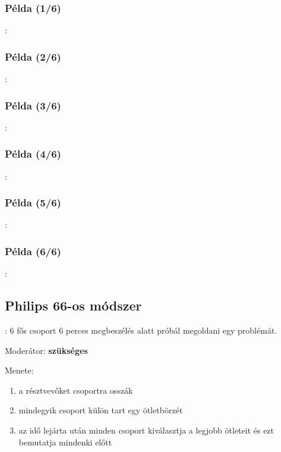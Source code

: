 \documentclass{beamer}
\begin{document}
\subsubsection*{Példa (1/6)}
\begin{frame}{\subsecname : \subsubsecname}
    
\end{frame}

\subsubsection*{Példa (2/6)}
\begin{frame}{\subsecname : \subsubsecname}
    
\end{frame}

\subsubsection*{Példa (3/6)}
\begin{frame}{\subsecname : \subsubsecname}
    
\end{frame}

\subsubsection*{Példa (4/6)}
\begin{frame}{\subsecname : \subsubsecname}
    
\end{frame}

\subsubsection*{Példa (5/6)}
\begin{frame}{\subsecname : \subsubsecname}
    
\end{frame}

\subsubsection*{Példa (6/6)}
\begin{frame}{\subsecname : \subsubsecname}
    
\end{frame}

\subsection{Philips 66-os módszer}
\begin{frame}{\secname : \subsecname}
6 fős csoport 6 perces megbeszélés alatt próbál megoldani egy problémát.

Moderátor: \textbf{szükséges}

Menete:
\begin{enumerate}
    \item a résztvevőket csoportra osszák
    \item mindegyik csoport külön tart egy ötletbörzét
    \item az idő lejárta után minden csoport kiválasztja a legjobb ötleteit és ezt bemutatja mindenki előtt
\end{enumerate}
\end{frame}
\end{document}
